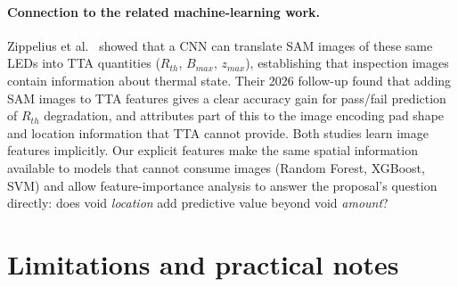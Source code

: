 \documentclass[11pt,a4paper]{article}
\begin{document}
\paragraph{Connection to the related machine-learning work.}
Zippelius et al.\ \cite{zippelius2022} showed that a CNN can translate SAM images of these same
LEDs into TTA quantities ($R_{th}$, $B_{max}$, $z_{max}$), establishing that inspection images
contain information about thermal state. Their 2026 follow-up \cite{zippelius2026} found that
adding SAM images to TTA features gives a clear accuracy gain for pass/fail prediction of
$R_{th}$ degradation, and attributes part of this to the image encoding pad shape and location
information that TTA cannot provide. Both studies learn image features implicitly. Our explicit
features make the same spatial information available to models that cannot consume images
(Random Forest, XGBoost, SVM) and allow feature-importance analysis to answer the proposal's
question directly: does void \emph{location} add predictive value beyond void \emph{amount}?

\section{Limitations and practical notes}
\end{document}
